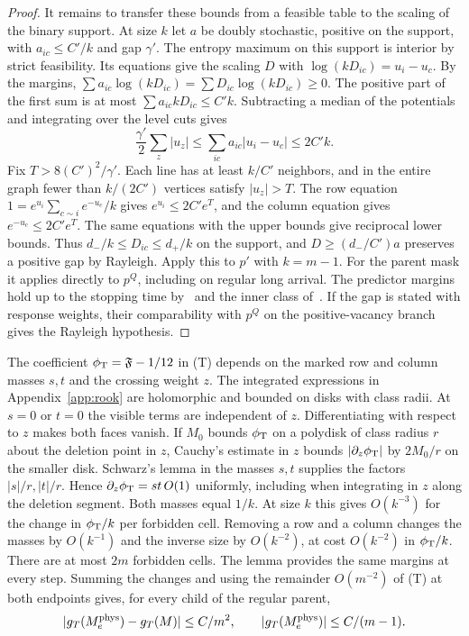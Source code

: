 \begin{proof}
It remains to transfer these bounds from a feasible table to the scaling of the binary support. At size
\(k\) let \(a\) be doubly stochastic, positive on the support, with \(a_{ic}\le C'/k\) and gap
\(\gamma'\). The entropy maximum on this support is interior by strict feasibility. Its equations give
the scaling \(D\) with \(\log(kD_{ic})=u_i-u_c\). By the margins, \(\sum a_{ic}\log(kD_{ic})=\sum
D_{ic}\log(kD_{ic})\ge0\). The positive part of the first sum is at most \(\sum a_{ic}kD_{ic}\le C'k\).
Subtracting a median of the potentials and integrating over the level cuts gives
\[
 \frac{\gamma'}2\sum_z|u_z|\le\sum_{ic}a_{ic}|u_i-u_c|\le2C'k .
\]
Fix \(T>8(C')^2/\gamma'\). Each line has at least \(k/C'\) neighbors, and in the entire graph fewer than
\(k/(2C')\) vertices satisfy \(|u_z|>T\). The row equation \(1=e^{u_i}\sum_{c\sim i} e^{-u_c}/k\) gives
\(e^{u_i}\le2C'e^T\), and the column equation gives \(e^{-u_c}\le2C'e^T\). The same equations with the
upper bounds give reciprocal lower bounds. Thus \(d_-/k\le D_{ic}\le d_+/k\) on the support, and
\(D\ge(d_-/C')a\) preserves a positive gap by Rayleigh. Apply this to \(p'\) with \(k=m-1\). For the
parent mask it applies directly to \(p^Q\), including on regular long arrival. The predictor
margins~\cite{pc} hold up to the stopping time by~\cite[Cor.~4.12]{tc} and the inner class of~\cite[Def.~2.2
and §§4--5]{tc}. If the gap is stated with response weights, their comparability with \(p^Q\) on the
positive-vacancy branch gives the Rayleigh hypothesis.
\end{proof}

The coefficient \(\phi_{\mathrm T}=\mathfrak F-1/12\) in (T) depends on the marked row and column masses \(s,t\)
and the crossing weight \(z\). The integrated expressions in Appendix~\ref{app:rook} are holomorphic and
bounded on disks with class radii. At \(s=0\) or \(t=0\) the visible terms are independent of \(z\).
Differentiating with respect to \(z\) makes both faces vanish. If \(M_0\) bounds \(\phi_{\mathrm T}\) on a polydisk
of class radius \(r\) about the deletion point in \(z\), Cauchy's estimate in \(z\) bounds
\(|\partial_z\phi_{\mathrm T}|\) by \(2M_0/r\) on the smaller disk. Schwarz's lemma in the masses \(s,t\) supplies
the factors \(|s|/r,|t|/r\). Hence \(\partial_z\phi_{\mathrm T}=st\,O(1)\) uniformly, including when integrating in
\(z\) along the deletion segment. Both masses equal \(1/k\). At size \(k\) this gives \(O(k^{-3})\) for
the change in \(\phi_{\mathrm T}/k\) per forbidden cell. Removing a row and a column changes the masses by
\(O(k^{-1})\) and the inverse size by \(O(k^{-2})\), at cost \(O(k^{-2})\) in \(\phi_{\mathrm T}/k\). There are at
most \(2m\) forbidden cells. The lemma provides the same margins at every step. Summing the changes and
using the remainder \(O(m^{-2})\) of (T) at both endpoints gives, for every child of the regular parent,
\begin{equation}\label{eq:incremento-hijo-fisico}
 |g_T(M_e^{\rm phys})-g_T(M)|\le C/m^2,\qquad |g_T(M_e^{\rm phys})|\le C/(m-1).
\end{equation}
